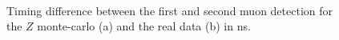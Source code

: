 \documentclass[twoside,        %
               BCOR12mm,       %
               ngerman,english, %
               fleqn,headsepline=false,footsepline=false
              ]{Vorlage/MFPREPORT}
\begin{document}
\begin{figure}
     \begin{center}
         \\ %
    \end{center}
    \caption{Timing difference between the first and second muon detection for
    the $Z$ monte-carlo (a) and the real data (b) in ns.}
   \label{fig:timing}
\end{figure}
\end{document}
